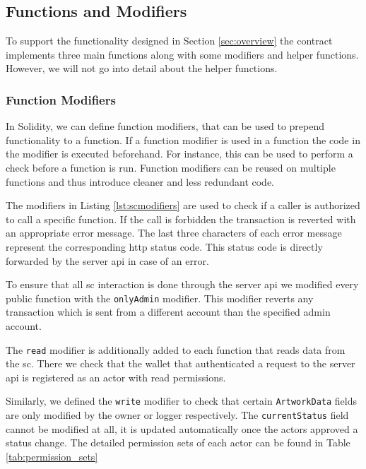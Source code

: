 

\subsection{Functions and Modifiers}
To support the functionality designed in Section \ref{sec:overview} the contract implements three main functions along with some modifiers and helper functions. However, we will not go into detail about the helper functions.

\subsubsection{Function Modifiers}
In Solidity, we can define function modifiers, that can be used to prepend functionality to a function. If a function modifier is used in a function the code in the modifier is executed beforehand. For instance, this can be used to perform a check before a function is run. Function modifiers can be reused on multiple functions and thus introduce cleaner and less redundant code.



The modifiers in Listing \ref{lst:scmodifiers} are used to check if a caller is authorized to call a specific function. If the call is forbidden the transaction is reverted with an appropriate error message. The last three characters of each error message represent the corresponding \gls{http} status code. This status code is directly forwarded by the server \gls{api} in case of an error.

To ensure that all \gls{sc} interaction is done through the server \gls{api} we modified every public function with the \texttt{onlyAdmin} modifier. This modifier reverts any transaction which is sent from a different account than the specified admin account.

The \texttt{read} modifier is additionally added to each function that reads data from the \gls{sc}. There we check that the wallet that authenticated a request to the server \gls{api} is registered as an actor with read permissions.

Similarly, we defined the \texttt{write} modifier to check that certain \texttt{ArtworkData} fields are only modified by the owner or logger respectively. The \texttt{currentStatus} field cannot be modified at all, it is updated automatically once the actors approved a status change. The detailed permission sets of each actor can be found in Table \ref{tab:permission_sets}

